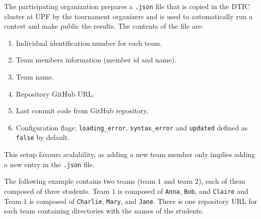 \documentclass[11pt]{article}
\begin{document}
The participating organization prepares a \texttt{.json} file that is copied in the DTIC cluster at UPF
by the tournament organizers and is used to automatically run a contest and make public the results.
The contents of the file are:
\begin{enumerate}
    \item Individual identification number for each team.
    \item Team members information (member id and name).
    \item Team name.
    \item Repository GitHub URL.
    \item Last commit code from GitHub repository.
    \item Configuration flags: \verb|loading_error|, \verb|syntax_error| and \texttt{updated} defined as \texttt{false} by default.
\end{enumerate}

This setup favours scalability, as adding a new team member only implies adding a new entry in the \texttt{.json} file.


The following example contains two teams (team $1$ and team $2$), each of them composed of three students.
Team $1$ is composed of \texttt{Anna}, \texttt{Bob}, and \texttt{Claire} and
Team $1$ is composed of \texttt{Charlie}, \texttt{Mary}, and \texttt{Jane}.
There is one repository URL for each team containing directories with the names of the students.


\end{document}
